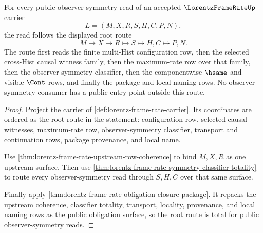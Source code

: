 \begin{theorem}
\label{thm:lorentz-frame-rate-root-route-totality}
For every public observer-symmetry read of an accepted $\LorentzFrameRateUp$
carrier
$$
L=(M,X,R,S,H,C,P,N),
$$
the read follows the displayed root route
$$
M \longmapsto X \longmapsto R \longmapsto S \longmapsto H,C \longmapsto P,N.
$$
The route first reads the finite multi-Hist configuration row, then the
selected cross-Hist causal witness family, then the maximum-rate row over
that family, then the observer-symmetry classifier, then the componentwise
$\hsame$ and visible $\Cont$ rows, and finally the package and local naming
rows. No observer-symmetry consumer has a public entry point outside this
route.
\end{theorem}
\begin{proof}
Project the carrier of \autoref{def:lorentz-frame-rate-carrier}. Its
coordinates are ordered as the root route in the statement: configuration
row, selected causal witnesses, maximum-rate row, observer-symmetry
classifier, transport and continuation rows, package provenance, and local
name.

Use \autoref{thm:lorentz-frame-rate-upstream-row-coherence} to bind
$M,X,R$ as one upstream surface. Then use
\autoref{thm:lorentz-frame-rate-symmetry-classifier-totality} to route every
observer-symmetry read through $S,H,C$ over that same surface.

Finally apply \autoref{thm:lorentz-frame-rate-obligation-closure-package}.
It repacks the upstream coherence, classifier totality, transport, locality,
provenance, and local naming rows as the public obligation surface, so the
root route is total for public observer-symmetry reads.
\end{proof}

